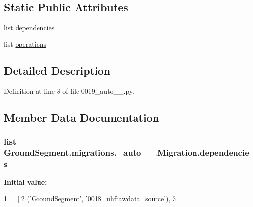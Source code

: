 \subsection*{Static Public Attributes}
\begin{DoxyCompactItemize}
\item 
list \hyperlink{class_ground_segment_1_1migrations_1_10019__auto__20161202__1004_1_1_migration_a4d8ce65df33f13dbdd9066b79d019c35}{dependencies}
\item 
list \hyperlink{class_ground_segment_1_1migrations_1_10019__auto__20161202__1004_1_1_migration_ae683ecfa5833a7a9ebc1804e95c91bfc}{operations}
\end{DoxyCompactItemize}


\subsection{Detailed Description}


Definition at line 8 of file 0019\+\_\+auto\+\_\+\_.\+py.



\subsection{Member Data Documentation}
\hypertarget{class_ground_segment_1_1migrations_1_10019__auto__20161202__1004_1_1_migration_a4d8ce65df33f13dbdd9066b79d019c35}{}
\subsubsection[{dependencies}]{\setlength{\rightskip}{0pt plus 5cm}list Ground\+Segment.\+migrations.\+\_\+auto\+\_\+\_.\+Migration.\+dependencies\hspace{0.3cm}{\ttfamily [static]}}\label{class_ground_segment_1_1migrations_1_10019__auto__20161202__1004_1_1_migration_a4d8ce65df33f13dbdd9066b79d019c35}
{\bfseries Initial value\+:}
\begin{DoxyCode}
1 = [
2         (\textcolor{stringliteral}{'GroundSegment'}, \textcolor{stringliteral}{'0018\_uhfrawdata\_source'}),
3     ]
\end{DoxyCode}


